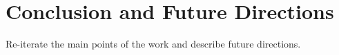 \section{Conclusion and Future Directions}
\label{sec:conclusion}

Re-iterate the main points of the work and describe future directions.
